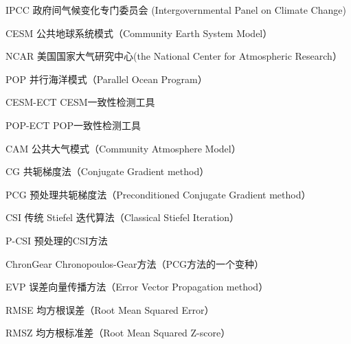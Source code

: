 \begin{denotation}[3cm]
\item[IPCC] 政府间气候变化专门委员会 (Intergovernmental Panel on Climate Change)
\item[CESM]  公共地球系统模式（Community Earth System Model）
\item[NCAR]  美国国家大气研究中心(the National Center for Atmospheric Research）
\item[POP]  并行海洋模式（Parallel Ocean Program）
\item[CESM-ECT]  CESM一致性检测工具
\item[POP-ECT]  POP一致性检测工具
\item[CAM]  公共大气模式（Community Atmosphere Model）
\item[CG]	共轭梯度法（Conjugate Gradient method）
\item[PCG]  预处理共轭梯度法（Preconditioned Conjugate Gradient method）
\item[CSI]  传统 Stiefel 迭代算法（Classical Stiefel Iteration）
\item[P-CSI]  预处理的CSI方法
\item[ChronGear] Chronopoulos-Gear方法（PCG方法的一个变种）
\item[EVP] 误差向量传播方法（Error Vector Propagation method）
\item[RMSE] 均方根误差（Root Mean Squared Error）
\item[RMSZ] 均方根标准差（Root Mean Squared Z-score）
\end{denotation}
